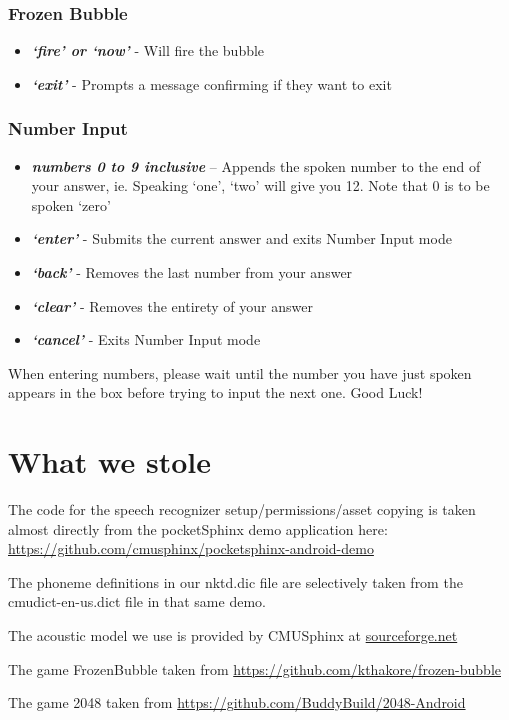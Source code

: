 \documentclass[11pt, oneside]{article}
\begin{document}
\subsubsection*{Frozen Bubble}

\begin{itemize}
	\item {\em\bf`fire' or `now'} - Will fire the bubble
	\item {\em\bf`exit'} - Prompts a message confirming if they want to exit
	
\end{itemize}

\pagebreak

\subsubsection*{Number Input}
\begin{itemize}
  \item {\em\bf numbers 0 to 9 inclusive} – Appends the spoken number
    to the end of your answer, ie. Speaking `one', `two' will give you
    12. Note that 0 is to be spoken `zero'
  \item {\em\bf `enter'} - Submits the current answer and exits Number
    Input mode
  \item {\em\bf `back'} - Removes the last number from your answer
  \item {\em\bf `clear'} - Removes the entirety of your answer
  \item {\em\bf `cancel'} - Exits Number Input mode
\end{itemize}

When entering numbers, please wait until the number you have just spoken appears
in the box before trying to input the next one.
Good Luck!

\section*{What we stole}

The code for the speech recognizer setup/permissions/asset copying is
taken almost directly from the pocketSphinx demo application here:
\url{https://github.com/cmusphinx/pocketsphinx-android-demo}

The phoneme definitions in our nktd.dic file are selectively taken
from the cmudict-en-us.dict file in that same demo.

The acoustic model we use is provided by CMUSphinx at
\href{https://sourceforge.net/projects/cmusphinx/files/Acoustic\%20and\%20Language\%20Models/US\%20English/}{sourceforge.net}

The game FrozenBubble taken from
\url{https://github.com/kthakore/frozen-bubble}

The game 2048 taken from
\url{https://github.com/BuddyBuild/2048-Android}
    
\end{document}
